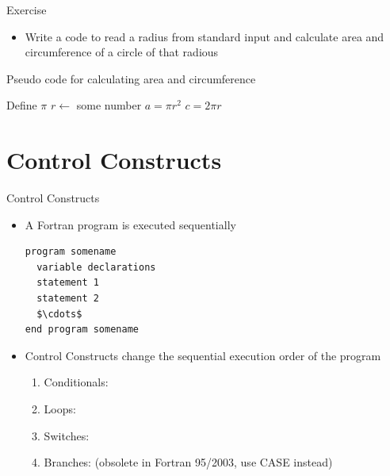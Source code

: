 \documentclass[10pt,t]{beamer}
\begin{document}
\begin{frame}{Exercise}
  \begin{itemize}
  \item Write a code to read a radius from standard input and calculate area and circumference of a circle of that radious
  \end{itemize}
  \begin{algorithm}[H]
    \caption{Pseudo code for calculating area and circumference}
    \begin{algorithmic}
      \State Define $\pi$
      \State $r \gets$ some number
      \State $a = \pi{}r^2$
      \State $c = 2\pi{}r$
    \end{algorithmic}
  \end{algorithm}
\end{frame}

\section{Control Constructs}
\begin{frame}[fragile] {Control Constructs}
  \begin{itemize}
    \item A Fortran program is executed sequentially
      \begin{lstlisting}[language={[90]Fortran},mathescape]
program somename 
  variable declarations
  statement 1
  statement 2
  $\cdots$
end program somename
      \end{lstlisting}
    \item Control Constructs change the sequential execution order of the program
      \begin{enumerate} %
        \item Conditionals: 
        \item Loops: 
        \item Switches: 
        \item Branches:  (obsolete in Fortran 95/2003, use CASE instead)
      \end{enumerate}
  \end{itemize}
\end{frame}
\end{document}
